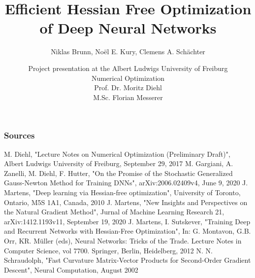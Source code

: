 \documentclass{beamer}
\title[Hessian Free Optimization]{Efficient Hessian Free Optimization of Deep Neural Networks}
\subtitle{Niklas Brunn, No\"{e}l E. Kury, Clemens A. Schächter}
\author[Numerical Optimization]{Project presentation at the Albert Ludwigs University of Freiburg\\
Numerical Optimization\\
Prof. Dr. Moritz Diehl\\
M.Sc. Florian Messerer}
\begin{document}
	
	\begin{frame}
		\titlepage
	\end{frame}
	
	
	
	
	


	\begin{frame}
		\frametitle{Sources}
		\begin{thebibliography}{9}
			
			 M. Diehl, "Lecture Notes on Numerical Optimization (Preliminary Draft)", Albert Ludwigs University of Freiburg, September 29, 2017	
			 M. Gargiani, A. Zanelli, M. Diehl, F. Hutter, "\text{}On the Promise of the Stochastic Generalized Gauss-Newton Method for Training DNNs",  arXiv:2006.02409v4, June 9, 2020 
			 J. Martens, "Deep learning via Hessian-free optimization", University of Toronto, Ontario, M5S 1A1, Canada, 2010
			 J. Martens, "New Insights and Perspectives on the Natural Gradient Method", Jurnal of Machine Learning Research 21, arXiv:1412.1193v11, September 19, 2020
			 J. Martens, I. Sutskever, "Training Deep and Recurrent Networks with Hessian-Free Optimization", In: G. Montavon, G.B. Orr, KR. Müller (eds), Neural Networks: Tricks of the Trade. Lecture Notes in Computer Science, vol 7700. Springer, Berlin, Heidelberg, 2012
			 N. N. Schraudolph, "Fast Curvature Matrix-Vector Products for Second-Order
			Gradient Descent", Neural Computation, August 2002
			
			
		\end{thebibliography}
	\end{frame}
	
\end{document}
